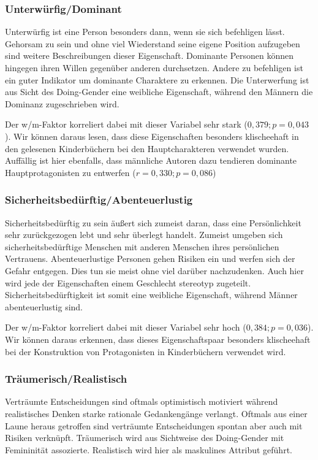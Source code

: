 \subsubsection{Unterwürfig/Dominant}

Unterwürfig ist eine Person besonders dann, wenn sie sich befehligen
lässt. Gehorsam zu sein und ohne viel Wiederstand seine eigene Position
aufzugeben sind weitere Beschreibungen dieser Eigenschaft. Dominante
Personen können hingegen ihren Willen gegenüber anderen durchsetzen.
Andere zu befehligen ist ein guter Indikator um dominante Charaktere zu
erkennen. Die Unterwerfung ist aus Sicht des Doing-Gender eine weibliche
Eigenschaft, während den Männern die Dominanz zugeschrieben wird.

Der w/m-Faktor korreliert dabei mit dieser Variabel sehr stark
($0{,}379; p=0{,}043$). Wir können daraus lesen, dass diese
Eigenschaften besonders klischeehaft in den gelesenen Kinderbüchern bei
den Hauptcharakteren verwendet wurden. Auffällig ist hier ebenfalls,
dass männliche Autoren dazu tendieren dominante Hauptprotagonisten zu
entwerfen ($r = 0{,}330; p=0{,}086$)

\subsubsection{Sicherheitsbedürftig/Abenteuerlustig}

Sicherheitsbedürftig zu sein äußert sich zumeist daran, dass eine
Persönlichkeit sehr zurückgezogen lebt und sehr überlegt handelt.
Zumeist umgeben sich sicherheitsbedürftige Menschen mit anderen Menschen
ihres persönlichen Vertrauens. Abenteuerlustige Personen gehen Risiken
ein und werfen sich der Gefahr entgegen. Dies tun sie meist ohne viel
darüber nachzudenken. Auch hier wird jede der Eigenschaften einem
Geschlecht stereotyp zugeteilt. Sicherheitsbedürftigkeit ist somit eine
weibliche Eigenschaft, während Männer abenteuerlustig sind.

Der w/m-Faktor korreliert dabei mit dieser Variabel sehr hoch
($0{,}384; p = 0{,}036$). Wir können daraus erkennen, dass dieses
Eigenschaftspaar besonders klischeehaft bei der Konstruktion von
Protagonisten in Kinderbüchern verwendet wird.

\subsubsection{Träumerisch/Realistisch}

Verträumte Entscheidungen sind oftmals optimistisch motiviert während
realistisches Denken starke rationale Gedankengänge verlangt. Oftmals
aus einer Laune heraus getroffen sind verträumte Entscheidungen spontan
aber auch mit Risiken verknüpft. Träumerisch wird aus Sichtweise des
Doing-Gender mit Femininität assozierte. Realistisch wird hier als
maskulines Attribut geführt.

